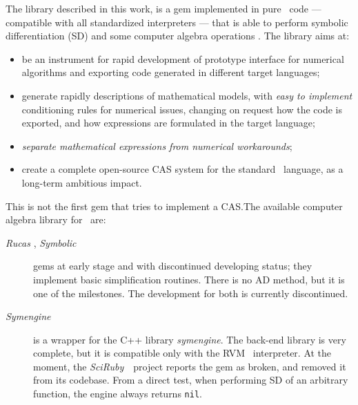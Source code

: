 The library described in this work, is a gem implemented in pure \Ruby~code --- compatible with all standardized interpreters --- that is able to perform symbolic differentiation (SD) and some computer algebra operations \cite{von2013modern}. The library aims at:
\begin{itemize}
  \item be an instrument for rapid development of prototype interface for numerical algorithms and exporting code generated in different target languages;
  \item generate rapidly descriptions of mathematical models, with \emph{easy to implement} conditioning rules for numerical issues, changing on request how the code is exported, and how expressions are formulated in the target language;
  \item \emph{separate mathematical expressions from numerical workarounds};
  \item create a complete open-source CAS system for the standard \Ruby~language, as a long-term ambitious impact.
\end{itemize}

This is not the first gem that tries to implement a CAS.\@ The available computer algebra library for \Ruby~are:
\begin{description}
  \item [\emph{Rucas} \cite{rucas}, \emph{Symbolic} \cite{symbolic}] gems at early stage and with discontinued developing status; they implement basic simplification routines. There is no AD method, but it is one of the milestones. The development for both is currently discontinued.
  \item [\emph{Symengine} \cite{symengine}] is a wrapper for the C++ library \emph{symengine}. The back-end library is very complete, but it is compatible only with the RVM \Ruby~interpreter. At the moment, the \emph{SciRuby}~\cite{sciruby}~project reports the gem as broken, and removed it from its codebase. From a direct test, when performing SD of an arbitrary function, the engine always returns \texttt{nil}.
\end{description}
